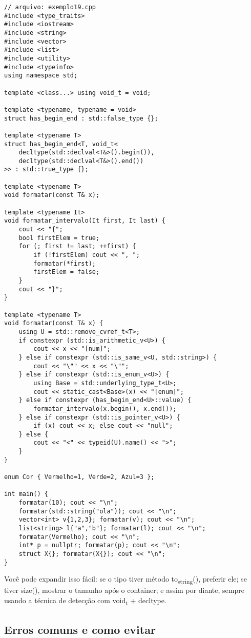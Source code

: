\documentclass[11pt]{article}
\begin{document}
\begin{verbatim}
// arquivo: exemplo19.cpp
#include <type_traits>
#include <iostream>
#include <string>
#include <vector>
#include <list>
#include <utility>
#include <typeinfo>
using namespace std;

template <class...> using void_t = void;

template <typename, typename = void>
struct has_begin_end : std::false_type {};

template <typename T>
struct has_begin_end<T, void_t<
    decltype(std::declval<T&>().begin()),
    decltype(std::declval<T&>().end())
>> : std::true_type {};

template <typename T>
void formatar(const T& x);

template <typename It>
void formatar_intervalo(It first, It last) {
    cout << "{";
    bool firstElem = true;
    for (; first != last; ++first) {
        if (!firstElem) cout << ", ";
        formatar(*first);
        firstElem = false;
    }
    cout << "}";
}

template <typename T>
void formatar(const T& x) {
    using U = std::remove_cvref_t<T>;
    if constexpr (std::is_arithmetic_v<U>) {
        cout << x << "[num]";
    } else if constexpr (std::is_same_v<U, std::string>) {
        cout << "\"" << x << "\"";
    } else if constexpr (std::is_enum_v<U>) {
        using Base = std::underlying_type_t<U>;
        cout << static_cast<Base>(x) << "[enum]";
    } else if constexpr (has_begin_end<U>::value) {
        formatar_intervalo(x.begin(), x.end());
    } else if constexpr (std::is_pointer_v<U>) {
        if (x) cout << x; else cout << "null";
    } else {
        cout << "<" << typeid(U).name() << ">";
    }
}

enum Cor { Vermelho=1, Verde=2, Azul=3 };

int main() {
    formatar(10); cout << "\n";
    formatar(std::string("ola")); cout << "\n";
    vector<int> v{1,2,3}; formatar(v); cout << "\n";
    list<string> l{"a","b"}; formatar(l); cout << "\n";
    formatar(Vermelho); cout << "\n";
    int* p = nullptr; formatar(p); cout << "\n";
    struct X{}; formatar(X{}); cout << "\n";
}
\end{verbatim}

Você pode expandir isso fácil: se o tipo tiver método to\textsubscript{string}(), preferir ele; se tiver size(), mostrar o tamanho após o container; e assim por diante, sempre usando a técnica de detecção com void\textsubscript{t} + decltype.
\subsection{Erros comuns e como evitar}
\label{sec:org9323a2f}
\end{document}
